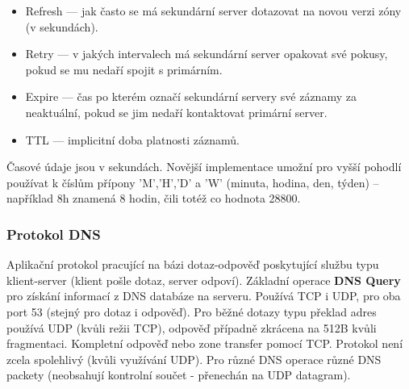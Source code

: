 \documentclass[10pt,a4paper]{article}
\begin{document}
\begin{itemize}
\begin{itemize}
		\item Refresh — jak často se má sekundární server dotazovat na novou verzi zóny (v sekundách).
		\item Retry — v jakých intervalech má sekundární server opakovat své pokusy, pokud se mu nedaří spojit s primárním.
		\item Expire — čas po kterém označí sekundární servery své záznamy za neaktuální, pokud se jim nedaří kontaktovat primární server.
		\item TTL — implicitní doba platnosti záznamů.
	\end{itemize}
	Časové údaje jsou v sekundách. Novější implementace umožní pro vyšší pohodlí používat k číslům přípony 'M','H','D' a 'W' (minuta, hodina, den, týden) – například 8h znamená 8 hodin, čili totéž co hodnota 28800.
\end{itemize}

\subsubsection{Protokol DNS}
Aplikační protokol pracující na bázi dotaz-odpověď poskytující službu typu klient-server (klient pošle dotaz, server odpoví). Základní operace \textbf{DNS Query} pro získání informací z DNS databáze na serveru. Používá TCP i UDP, pro oba port 53 (stejný pro dotaz i odpověď). Pro běžné dotazy typu překlad adres používá UDP (kvůli režii TCP), odpověď případně zkrácena na 512B kvůli fragmentaci. Kompletní odpověď nebo zone transfer pomocí TCP. Protokol není zcela spolehlivý (kvůli využívání UDP). Pro různé DNS operace různé DNS packety (neobsahují kontrolní součet - přenechán na UDP datagram).
\end{document}
